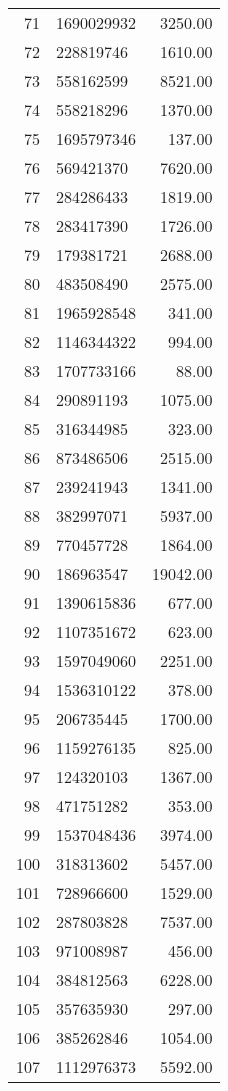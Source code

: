 \begin{table}[ht]
\begin{tabular}{rlr}
  71 & 1690029932 & 3250.00 \\ 
  72 & 228819746 & 1610.00 \\ 
  73 & 558162599 & 8521.00 \\ 
  74 & 558218296 & 1370.00 \\ 
  75 & 1695797346 & 137.00 \\ 
  76 & 569421370 & 7620.00 \\ 
  77 & 284286433 & 1819.00 \\ 
  78 & 283417390 & 1726.00 \\ 
  79 & 179381721 & 2688.00 \\ 
  80 & 483508490 & 2575.00 \\ 
  81 & 1965928548 & 341.00 \\ 
  82 & 1146344322 & 994.00 \\ 
  83 & 1707733166 & 88.00 \\ 
  84 & 290891193 & 1075.00 \\ 
  85 & 316344985 & 323.00 \\ 
  86 & 873486506 & 2515.00 \\ 
  87 & 239241943 & 1341.00 \\ 
  88 & 382997071 & 5937.00 \\ 
  89 & 770457728 & 1864.00 \\ 
  90 & 186963547 & 19042.00 \\ 
  91 & 1390615836 & 677.00 \\ 
  92 & 1107351672 & 623.00 \\ 
  93 & 1597049060 & 2251.00 \\ 
  94 & 1536310122 & 378.00 \\ 
  95 & 206735445 & 1700.00 \\ 
  96 & 1159276135 & 825.00 \\ 
  97 & 124320103 & 1367.00 \\ 
  98 & 471751282 & 353.00 \\ 
  99 & 1537048436 & 3974.00 \\ 
  100 & 318313602 & 5457.00 \\ 
  101 & 728966600 & 1529.00 \\ 
  102 & 287803828 & 7537.00 \\ 
  103 & 971008987 & 456.00 \\ 
  104 & 384812563 & 6228.00 \\ 
  105 & 357635930 & 297.00 \\ 
  106 & 385262846 & 1054.00 \\ 
  107 & 1112976373 & 5592.00 \\ 

\end{tabular}
\end{table}
